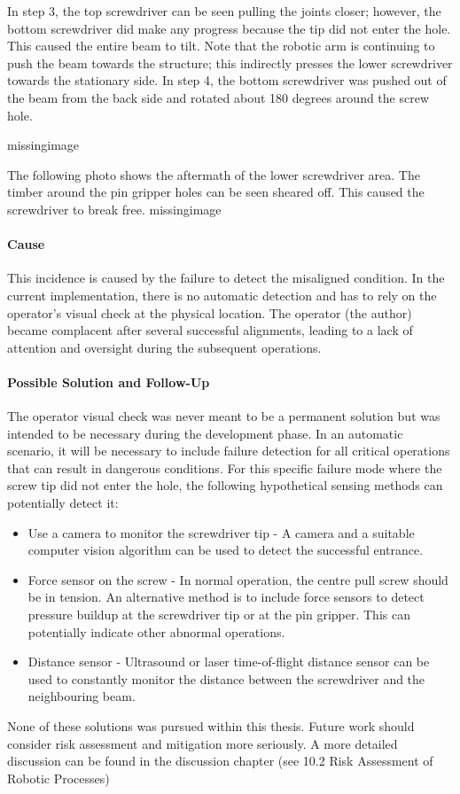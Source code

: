 In step 3, the top screwdriver can be seen pulling the joints closer; however, the bottom screwdriver did make any progress because the tip did not enter the hole. This caused the entire beam to tilt. Note that the robotic arm is continuing to push the beam towards the structure; this indirectly presses the lower screwdriver towards the stationary side. In step 4, the bottom screwdriver was pushed out of the beam from the back side and rotated about 180 degrees around the screw hole. 

missingimage

The following photo shows the aftermath of the lower screwdriver area. The timber around the pin gripper holes can be seen sheared off. This caused the screwdriver to break free.
missingimage

\paragraph{Cause}
This incidence is caused by the failure to detect the misaligned condition. In the current implementation, there is no automatic detection and has to rely on the operator’s visual check at the physical location. 
The operator (the author) became complacent after several successful alignments, leading to a lack of attention and oversight during the subsequent operations.

\paragraph{Possible Solution and Follow-Up}
The operator visual check was never meant to be a permanent solution but was intended to be necessary during the development phase. In an automatic scenario, it will be necessary to include failure detection for all critical operations that can result in dangerous conditions. For this specific failure mode where the screw tip did not enter the hole, the following hypothetical sensing methods can potentially detect it:

\begin{itemize}
    \item Use a camera to monitor the screwdriver tip - A camera and a suitable computer vision algorithm can be used to detect the successful entrance.
    \item Force sensor on the screw - In normal operation, the centre pull screw should be in tension. An alternative method is to include force sensors to detect pressure buildup at the screwdriver tip or at the pin gripper. This can potentially indicate other abnormal operations.
    \item Distance sensor - Ultrasound or laser time-of-flight distance sensor can be used to constantly monitor the distance between the screwdriver and the neighbouring beam.

\end{itemize}
None of these solutions was pursued within this thesis. Future work should consider risk assessment and mitigation more seriously. A more detailed discussion can be found in the discussion chapter (see 10.2 Risk Assessment of Robotic Processes)

